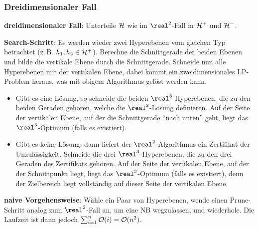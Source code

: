 \pagebreak

\subsubsection{%
    Dreidimensionaler Fall%
}

\textbf{dreidimensionaler Fall}:
Unterteile $\mathcal{H}$ wie im $\real^2$-Fall in $\mathcal{H}^+$ und $\mathcal{H}^-$.

\textbf{Search-Schritt}:
Es werden wieder zwei Hyperebenen vom gleichen Typ betrachtet (z.\,B. $h_1, h_2 \in \mathcal{H}^+$).
Berechne die Schnittgerade der beiden Ebenen und bilde die vertikale Ebene durch die Schnittgerade.
Schneide nun alle Hyperebenen mit der vertikalen Ebene,
dabei kommt ein zweidimensionales LP-Problem heraus, was mit obigem Algorithmus gelöst werden kann.
\begin{itemize}
    \item
    Gibt es eine Lösung, so schneide die beiden $\real^3$-Hyperebenen, die zu den beiden Geraden
    gehören, welche die $\real^2$-Lösung definieren.
    Auf der Seite der vertikalen Ebene, auf der die Schnittgerade "`nach unten"' geht,
    liegt das $\real^3$-Optimum (falls es existiert).
    
    \item
    Gibt es keine Lösung, dann liefert der $\real^2$-Algorithmus ein Zertifikat der Unzulässigkeit.
    Schneide die drei $\real^3$-Hyperebenen, die zu den drei Geraden des Zertifikats gehören.
    Auf der Seite der vertikalen Ebene, auf der der Schnittpunkt liegt, liegt das $\real^3$-Optimum
    (falls es existiert), denn der Zielbereich liegt vollständig auf dieser Seite der vertikalen
    Ebene.
\end{itemize}

\linie

\textbf{naive Vorgehensweise}:
Wähle ein Paar von Hyperebenen, wende einen Prune-Schritt analog zum $\real^2$-Fall an,
um eine NB wegzulassen, und wiederhole.
Die Laufzeit ist dann jedoch $\sum_{i=1}^n \mathcal{O}(i) = \mathcal{O}(n^2)$.

